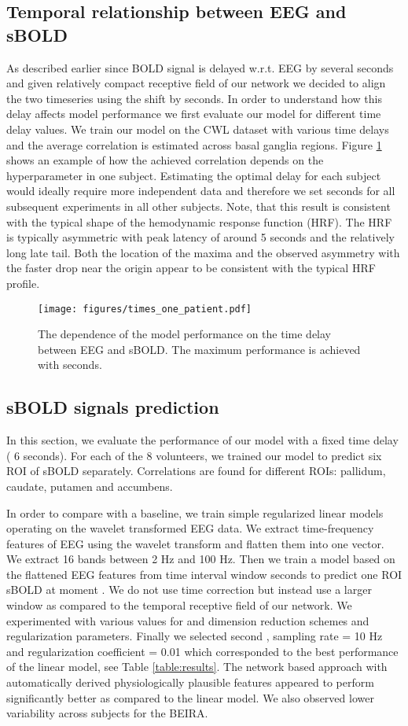 \documentclass{article}
\begin{document}
\subsection{Temporal relationship between EEG and sBOLD }
As described earlier since BOLD signal is delayed w.r.t. EEG by several seconds and given relatively compact receptive field of our network we decided to align the two timeseries using the shift by  seconds.  In order to understand how this delay affects model performance we first evaluate our model for different time delay values. We train our model on the CWL dataset with various time delays and the average correlation is estimated across basal ganglia regions. Figure \ref{fig:times} shows an example of how the achieved correlation depends on the  hyperparameter in one subject. Estimating the optimal delay for each subject  would  ideally require more independent data and therefore we set  seconds for all subsequent experiments in all other subjects. Note, that this result is  consistent with the typical shape of the hemodynamic response function (HRF). The HRF is typically asymmetric with peak latency of around 5 seconds and the relatively long late tail. Both the location of the maxima and the observed asymmetry with the faster drop near the origin appear to be consistent with the typical HRF profile.  

\begin{figure}[ht]
    \centering
    \texttt{[image: figures/times\_one\_patient.pdf]}
    \caption{\label{fig:times} The dependence of the model performance on the time delay between EEG and sBOLD. The maximum performance is achieved with  seconds.
     }
\end{figure}

\subsection{sBOLD signals prediction}
In this section, we evaluate the performance of our model with a fixed time delay ( 6 seconds). For each of the 8 volunteers, we trained our model to predict six ROI of sBOLD separately. Correlations are found for different ROIs: pallidum, caudate, putamen and accumbens.

In order to compare with a baseline, we train simple regularized linear models operating on the wavelet transformed EEG data. We extract time-frequency features of EEG using the wavelet transform and flatten them into one vector. We extract 16 bands between 2 Hz and 100 Hz.  Then we train a model based on the flattened EEG features from time interval window  seconds to predict one ROI sBOLD at moment . We do not use time correction but instead use a larger window as compared to the temporal receptive field of our network. We experimented with various values for  and dimension reduction schemes and regularization parameters. Finally we selected  second , sampling rate = 10 Hz and regularization coefficient = 0.01 which corresponded to the best performance of the linear model, see Table \ref{table:results}. The network based approach with automatically derived physiologically plausible features appeared to perform significantly better as compared to the linear model. We also observed lower variability across subjects for the BEIRA.
\end{document}
